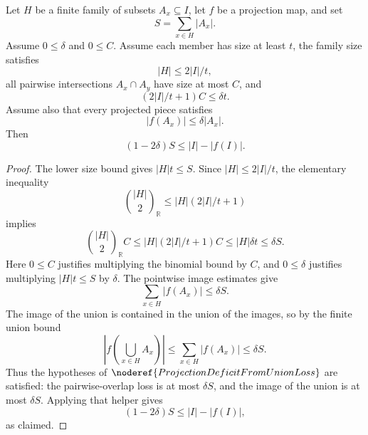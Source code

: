 \begin{helper}
Let \(H\) be a finite family of subsets \(A_x\subseteq I\), let \(f\) be a
projection map, and set
\[
S=\sum_{x\in H}|A_x|.
\]
Assume \(0\le\delta\) and \(0\le C\).  Assume each member has size at least
\(t\), the family size satisfies
\[
|H|\le 2|I|/t,
\]
all pairwise intersections \(A_x\cap A_y\) have size at most \(C\), and
\[
(2|I|/t+1)C\le\delta t.
\]
Assume also that every projected piece satisfies
\[
|f(A_x)|\le\delta |A_x|.
\]
Then
\[
(1-2\delta)S\le |I|-|f(I)|.
\]
\end{helper}
\begin{proof}
The lower size bound gives \( |H|t\le S\).  Since
\(|H|\le2|I|/t\), the elementary inequality
\[
\binom{|H|}{2}_{\mathbb R}\le |H|(2|I|/t+1)
\]
implies
\[
\binom{|H|}{2}_{\mathbb R}C
\le |H|(2|I|/t+1)C
\le |H|\delta t
\le \delta S.
\]
Here \(0\le C\) justifies multiplying the binomial bound by \(C\), and
\(0\le\delta\) justifies multiplying \(|H|t\le S\) by \(\delta\).
The pointwise image estimates give
\[
\sum_{x\in H}|f(A_x)|\le \delta S.
\]
The image of the union is contained in the union of the images, so by the
finite union bound
\[
\left|f\!\left(\bigcup_{x\in H}A_x\right)\right|
\le \sum_{x\in H}|f(A_x)|
\le\delta S.
\]
Thus the hypotheses of \(\noderef{ProjectionDeficitFromUnionLoss}\) are
satisfied: the pairwise-overlap loss is at most \(\delta S\), and the image of
the union is at most \(\delta S\).  Applying that helper gives
\[
(1-2\delta)S\le |I|-|f(I)|,
\]
as claimed.
\end{proof}

